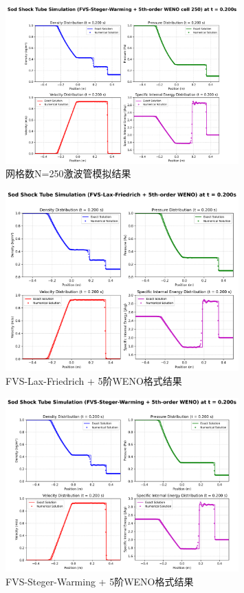 \documentclass[12pt,a4paper]{article}
\begin{document}
\begin{figure}[!htbp]
    \centering
    \includegraphics[width=0.8\textwidth]{FVS-Steger-Warming + 5th-order WENO cell 250_t_0p200s.png}
    \caption{网格数N=250激波管模拟结果}
\end{figure}
\begin{figure}[!htbp]
    \centering
    \includegraphics[width=0.8\textwidth]{Sod_Shock_FVS-Lax-Friedrich + 5th-order WENO_t_0p200s.png}
    \caption{FVS-Lax-Friedrich + 5阶WENO格式结果}
\end{figure}
\begin{figure}[!htbp]
    \centering
    \includegraphics[width=0.8\textwidth]{Sod_Shock_FVS-Steger-Warming + 5th-order WENO_t_0p200s.png}
    \caption{FVS-Steger-Warming + 5阶WENO格式结果}
\end{figure}
\end{document}
